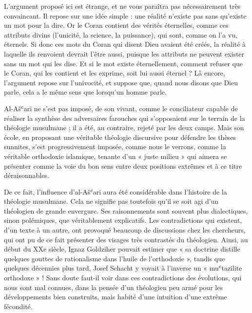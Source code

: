 L'argument proposé ici est étrange, et ne vous paraîtra pas
nécessairement très convaincant. Il repose sur une idée simple : une
réalité n'existe pas sans qu'existe un mot pour la dire. Or le Coran
contient des vérités éternelles, comme ces attributs divins (l'unicité,
la science, la puissance), qui sont, comme on l'a vu, éternels. Si donc
ces mots du Coran qui disent Dieu avaient été créés, la réalité à
laquelle ils renvoient devrait l'être aussi, puisque les attributs ne
peuvent exister sans un mot qui les dise. Et si le mot existe
éternellement, comment refuser que le Coran, qui les contient et les
exprime, soit lui aussi éternel ? Là encore, l'argument repose sur
l'univocité, et suppose que, quand nous disons que Dieu parle, cela a le
même sens que lorsqu'un homme parle.

Al-Ašʿarī ne s'est pas imposé, de son vivant, comme le conciliateur
capable de réaliser la synthèse des adversaires farouches qui
s'opposaient sur le terrain de la théologie musulmane ; il a été, au
contraire, rejeté par les deux camps. Mais son école, en proposant une
véritable théologie discursive pour défendre les thèses sunnites, s'est
progressivement imposée, comme nous le verrons, comme la véritable
orthodoxie islamique, tenante d'un
« juste milieu » qui aimera se présenter comme la voie du bon sens entre
deux positions extrêmes et à ce titre déraisonnables.

De ce fait, l'influence d'al-Ašʿarī aura été considérable dans
l'histoire de la théologie musulmane. Cela ne signifie pas toutefois
qu'il se soit agi d'un théologien de grande envergure. Ses raisonnements
sont souvent plus dialectiques, sinon polémiques, que
véritablement explicatifs. Les contradictions qui existent, d'un texte à
un autre, ont provoqué beaucoup de discussions chez les chercheurs, qui
ont pu de ce fait présenter des visages très contrastés du théologien.
Ainsi, au début du XXe siècle, Ignaz Goldziher pouvait estimer que
« sa doctrine distille quelques gouttes de rationalisme dans l'huile de
l'orthodoxie », tandis que quelques décennies plus tard, Josef Schacht y
voyait à l'inverse un « muʿtazilite orthodoxe » ! Sans doute faut-il
voir dans ces contradictions des évolutions, qui nous sont mal connues,
dans la pensée d'un théologien peu armé pour les développements bien
construits, mais habité d'une intuition d'une extrême fécondité.
